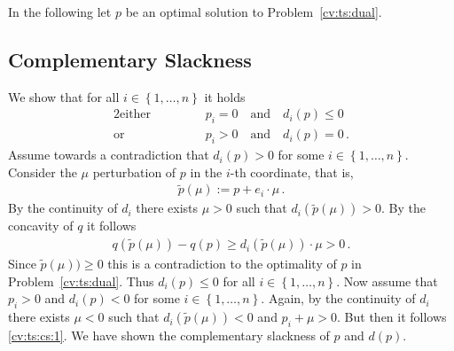 In the following let $p$ be an optimal solution to 
Problem~\ref{cv:ts:dual}.
\subsection*{Complementary Slackness}
We show that for all 
$
  i\in \left\{ 1,\ldots, n \right\}
$
it holds
\begin{alignat*}{2}
  \text{either}
  &
  &&
  \qquad
  p_i = 0
  \quad
  \text{and}
  \quad
  d_i(p) \le 0
  \\
  \text{or}
  &
  &&
  \qquad
  p_i > 0
  \quad
  \text{and}
  \quad
  d_i(p) = 0
  \,.
\end{alignat*}
Assume towards a contradiction that $d_i(p)>0$ for some 
$
  i\in \left\{ 1,\ldots, n \right\}
$.
Consider
the $\mu$ perturbation of $p$ in the $i$-th coordinate, that is,
\begin{gather}
  \tilde{p}
  (\mu)
  :=
  p
  +
  e_i
  \cdot
  \mu
  \,.
\end{gather}
By the continuity of $d_i$ there exists $\mu >0$ such that
$
d_i(
  \tilde{p}
  (\mu)
)
>0$.
By the concavity of $q$ it follows
\begin{gather}
  \label{cv:ts:cs:1}
  q
  (
  \tilde{p}
  (\mu)
  )
  -
  q(p)
  \ge
d_i(
  \tilde{p}
  (\mu)
)
\cdot
\mu
>0
\,.
\end{gather}
Since
$ 
  \tilde{p}
  (\mu)
  )
  \ge
  0
$
this is a contradiction to the optimality of $p$ in Problem~\ref{cv:ts:dual}. 
Thus
$
  d_i(p)\le 0
$
for all 
$
  i\in \left\{ 1,\ldots, n \right\}
$.
Now assume that
$ p_i>0 $ and 
$
  d_i(p)< 0
$
for some
$
  i\in \left\{ 1,\ldots, n \right\}
$.
Again, by the 
continuity of $d_i$ there exists $\mu <0$ such that
$
d_i(
  \tilde{p}
  (\mu)
)
<0$
and
$
p_i+\mu >0
$.
But then it follows \eqref{cv:ts:cs:1}.
We have shown the complementary slackness of $p$ and $d(p)$.

